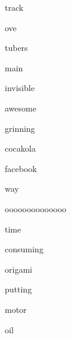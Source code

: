 \documentclass[varwidth]{standalone}
\begin{document}
\begin{CJK*}{UTF8}{gbsn}
{{{\colorbox{red!9.10948371887207}{\strut track}
\colorbox{red!10.868457794189453}{\strut ove}
\colorbox{red!11.601566314697266}{\strut tubers}
\colorbox{red!4.126714706420898}{\strut main}
\colorbox{red!11.519926071166992}{\strut invisible}
\colorbox{red!9.7009859085083}{\strut awesome}
\colorbox{red!8.953414916992188}{\strut grinning}
\colorbox{red!12.698217391967773}{\strut cocakola}
\colorbox{red!10.262935638427734}{\strut facebook}
\colorbox{red!10.99108600616455}{\strut way}
\colorbox{red!13.879060745239258}{\strut oooooooooooooo}
\colorbox{red!10.634696960449219}{\strut time}
\colorbox{red!7.444596290588379}{\strut consuming}
\colorbox{red!8.123198509216309}{\strut origami}
\colorbox{red!13.310656547546387}{\strut putting}
\colorbox{red!8.91659927368164}{\strut motor}
\colorbox{red!9.87700080871582}{\strut oil}

}}}
\end{CJK*}
\end{document}
